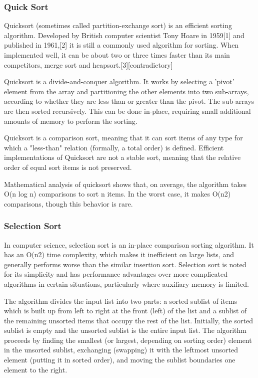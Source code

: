\subsubsection{Quick Sort}
Quicksort (sometimes called partition-exchange sort) is an efficient sorting algorithm. Developed by British computer scientist Tony Hoare in 1959[1] and published in 1961,[2] it is still a commonly used algorithm for sorting. When implemented well, it can be about two or three times faster than its main competitors, merge sort and heapsort.[3][contradictory]

Quicksort is a divide-and-conquer algorithm. It works by selecting a 'pivot' element from the array and partitioning the other elements into two sub-arrays, according to whether they are less than or greater than the pivot. The sub-arrays are then sorted recursively. This can be done in-place, requiring small additional amounts of memory to perform the sorting.

Quicksort is a comparison sort, meaning that it can sort items of any type for which a "less-than" relation (formally, a total order) is defined. Efficient implementations of Quicksort are not a stable sort, meaning that the relative order of equal sort items is not preserved.

Mathematical analysis of quicksort shows that, on average, the algorithm takes O(n log n) comparisons to sort n items. In the worst case, it makes O(n2) comparisons, though this behavior is rare.

\subsubsection{Selection Sort}
In computer science, selection sort is an in-place comparison sorting algorithm. It has an O(n2) time complexity, which makes it inefficient on large lists, and generally performs worse than the similar insertion sort. Selection sort is noted for its simplicity and has performance advantages over more complicated algorithms in certain situations, particularly where auxiliary memory is limited.

The algorithm divides the input list into two parts: a sorted sublist of items which is built up from left to right at the front (left) of the list and a sublist of the remaining unsorted items that occupy the rest of the list. Initially, the sorted sublist is empty and the unsorted sublist is the entire input list. The algorithm proceeds by finding the smallest (or largest, depending on sorting order) element in the unsorted sublist, exchanging (swapping) it with the leftmost unsorted element (putting it in sorted order), and moving the sublist boundaries one element to the right.

